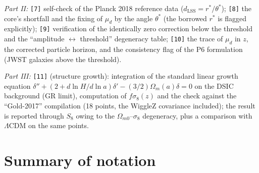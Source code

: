 \documentclass{article}
\begin{document}
\medskip
\noindent\textit{Part II:} \texttt{[7]} self-check of the Planck 2018 reference data ($d_{\text{LSS}} = r^*/\theta^*$); \texttt{[8]} the core's shortfall and the fixing of $\mu_d$ by the angle $\theta^*$ (the borrowed $r^*$ is flagged explicitly); \texttt{[9]} verification of the identically zero correction below the threshold and the ``amplitude $\leftrightarrow$ threshold'' degeneracy table; \texttt{[10]} the trace of $\mu_d$ in $z$, the corrected particle horizon, and the consistency flag of the P6 formulation (JWST galaxies above the threshold).

\medskip
\noindent\textit{Part III:} \texttt{[11]} (structure growth): integration of the standard linear growth equation $\delta'' + (2 + d\ln H/d\ln a)\delta' - (3/2)\Omega_m(a)\delta = 0$ on the DSIC background (GR limit), computation of $f\sigma_8(z)$ and the check against the ``Gold-2017'' compilation (18 points, the WiggleZ covariance included); the result is reported through $S_8$ owing to the $\Omega_{m0}$--$\sigma_8$ degeneracy, plus a comparison with $\Lambda$CDM on the same points.

\appendix

\section{Summary of notation}
\end{document}
